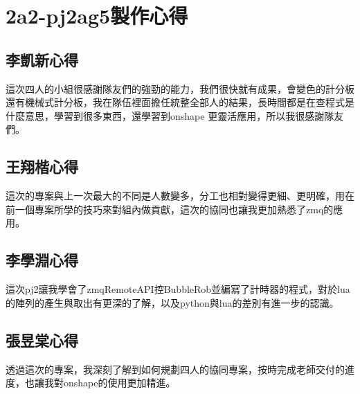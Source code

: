 \chapter{2a2-pj2ag5製作心得}
\section{李凱新心得}
這次四人的小組很感謝隊友們的強勁的能力，我們很快就有成果，會變色的計分板還有機械式計分板，我在隊伍裡面擔任統整全部人的結果，長時間都是在查程式是什麼意思，學習到很多東西，還學習到onshape 更靈活應用，所以我很感謝隊友們。
\section{王翔楷心得}
這次的專案與上一次最大的不同是人數變多，分工也相對變得更細、更明確，用在前一個專案所學的技巧來對組內做貢獻，這次的協同也讓我更加熟悉了zmq的應用。
\section{李學淵心得}
這次pj2讓我學會了zmqRemoteAPI控BubbleRob並編寫了計時器的程式，對於lua的陣列的產生與取出有更深的了解，以及python與lua的差別有進一步的認識。
\section{張昱棠心得}
透過這次的專案，我深刻了解到如何規劃四人的協同專案，按時完成老師交付的進度，也讓我對onshape的使用更加精進。
\newpage